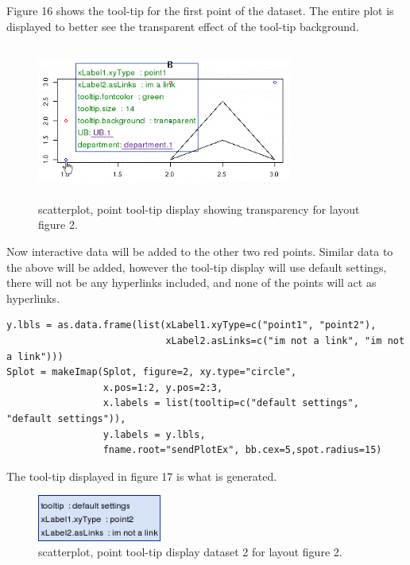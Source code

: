 \documentclass[]{article}
\begin{document}
Figure 16 shows the tool-tip for the first point of the dataset. The entire plot is displayed to better see the transparent effect of the tool-tip background. 

\begin{center}
\begin{figure}
\includegraphics[width=3.3in, height=2in]{tip4}
\caption{scatterplot, point tool-tip display showing transparency for layout figure 2.}
\end{figure}
\end{center}



Now interactive data will be added to the other two red points. Similar data to the above will be added, however the tool-tip display will use default settings, there will not be any hyperlinks included, and none of the points will act as hyperlinks. 


\begin{verbatim}
y.lbls = as.data.frame(list(xLabel1.xyType=c("point1", "point2"), 
                            xLabel2.asLinks=c("im not a link", "im not a link")))
Splot = makeImap(Splot, figure=2, xy.type="circle", 
                 x.pos=1:2, y.pos=2:3,
                 x.labels = list(tooltip=c("default settings", "default settings")),
                 y.labels = y.lbls,
                 fname.root="sendPlotEx", bb.cex=5,spot.radius=15)
\end{verbatim}

The tool-tip displayed in figure 17 is what is generated. 

\begin{center}
\begin{figure}
\includegraphics[width=1.6in, height=.6in]{tip5}
\caption{scatterplot, point tool-tip display dataset 2 for layout figure 2.}
\end{figure}
\end{center}
\end{document}
